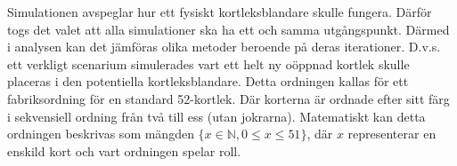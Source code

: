 \documentclass[swedish,a4paper]{article}
\begin{document}
Simulationen avspeglar hur ett fysiskt kortleksblandare skulle fungera. Därför
togs det valet att alla simulationer ska ha ett och samma utgångspunkt. Därmed i
analysen kan det jämföras olika metoder beroende på deras iterationer. D.v.s. ett verkligt
scenarium simulerades vart ett helt ny oöppnad kortlek skulle placeras i den
potentiella kortleksblandare. Detta ordningen kallas för ett fabriksordning för
en standard 52-kortlek. Där korterna är ordnade efter sitt färg i sekvensiell
ordning från två till ess (utan jokrarna). Matematiskt kan detta ordningen
beskrivas som mängden $\{x \in \mathbb{N},  0 \leq x \leq 51 \}$, där $x$
representerar en enskild kort och vart ordningen spelar roll. 
\end{document}
